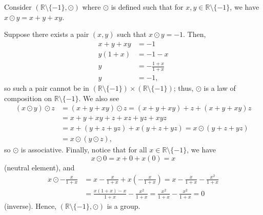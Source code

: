 \begin{exer}
Consider $ (\mathbb{R}\setminus\{-1\},\odot) $ where $ \odot $ is defined such that for $ x,y\in\mathbb{R}\setminus\{-1\} $, we have $ x\odot y=x+y+xy $.
\end{exer}
\begin{sltn}
Suppose there exists a pair $ (x,y) $ such that $ x\odot y=-1 $. Then,
\begin{align*}
    x+y+xy &= -1 \\
    y(1+x) &= -1-x \\
    y &= -\frac{1+x}{1+x} \\
    y &= -1,
\end{align*}
so such a pair cannot be in $ (\mathbb{R}\setminus\{-1\})\times(\mathbb{R}\setminus\{-1\}) $; thus, $ \odot $ is a law of composition on $ \mathbb{R}\setminus\{-1\} $. We also see
\begin{align*}
    (x\odot y)\odot z &= (x+y+xy)\odot z=(x+y+xy)+z+(x+y+xy)z \\
    &= x+y+xy+z+xz+yz+xyz \\
    &= x+(y+z+yz)+x(y+z+yz)=x\odot(y+z+yz) \\
    &= x\odot(y\odot z),
\end{align*}
so $ \odot $ is associative. Finally, notice that for all $ x\in\mathbb{R}\setminus\{-1\} $, we have
\begin{equation*}
    x\odot 0=x+0+x(0)=x
\end{equation*}
(neutral element), and
\begin{align*}
    x\odot -\frac{x}{1+x} &= x-\frac{x}{1+x}+x\left(-\frac{x}{1+x}\right)=x-\frac{x}{1+x}-\frac{x^2}{1+x} \\
    &= \frac{x(1+x)-x}{1+x}-\frac{x^2}{1+x}=\frac{x^2}{1+x}-\frac{x^2}{1+x}=0
\end{align*}
(inverse). Hence, $ (\mathbb{R}\setminus\{-1\},\odot) $ is a group.
\end{sltn}


